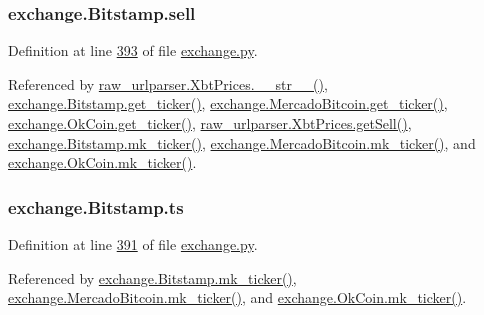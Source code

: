 \subsubsection[{\texorpdfstring{sell}{sell}}]{\setlength{\rightskip}{0pt plus 5cm}exchange.\+Bitstamp.\+sell}\hypertarget{classexchange_1_1_bitstamp_ae5bc1532848b36cd9ac5e46763f4ee14}{}\label{classexchange_1_1_bitstamp_ae5bc1532848b36cd9ac5e46763f4ee14}


Definition at line \hyperlink{exchange_8py_source_l00393}{393} of file \hyperlink{exchange_8py_source}{exchange.\+py}.



Referenced by \hyperlink{raw__urlparser_8py_source_l00074}{raw\+\_\+urlparser.\+Xbt\+Prices.\+\_\+\+\_\+str\+\_\+\+\_\+()}, \hyperlink{exchange_8py_source_l00401}{exchange.\+Bitstamp.\+get\+\_\+ticker()}, \hyperlink{exchange_8py_source_l00535}{exchange.\+Mercado\+Bitcoin.\+get\+\_\+ticker()}, \hyperlink{exchange_8py_source_l00600}{exchange.\+Ok\+Coin.\+get\+\_\+ticker()}, \hyperlink{raw__urlparser_8py_source_l00065}{raw\+\_\+urlparser.\+Xbt\+Prices.\+get\+Sell()}, \hyperlink{exchange_8py_source_l00415}{exchange.\+Bitstamp.\+mk\+\_\+ticker()}, \hyperlink{exchange_8py_source_l00549}{exchange.\+Mercado\+Bitcoin.\+mk\+\_\+ticker()}, and \hyperlink{exchange_8py_source_l00614}{exchange.\+Ok\+Coin.\+mk\+\_\+ticker()}.

\subsubsection[{\texorpdfstring{ts}{ts}}]{\setlength{\rightskip}{0pt plus 5cm}exchange.\+Bitstamp.\+ts}\hypertarget{classexchange_1_1_bitstamp_a8e85011dca7c70ffd1ed5ed398b0ed34}{}\label{classexchange_1_1_bitstamp_a8e85011dca7c70ffd1ed5ed398b0ed34}


Definition at line \hyperlink{exchange_8py_source_l00391}{391} of file \hyperlink{exchange_8py_source}{exchange.\+py}.



Referenced by \hyperlink{exchange_8py_source_l00415}{exchange.\+Bitstamp.\+mk\+\_\+ticker()}, \hyperlink{exchange_8py_source_l00549}{exchange.\+Mercado\+Bitcoin.\+mk\+\_\+ticker()}, and \hyperlink{exchange_8py_source_l00614}{exchange.\+Ok\+Coin.\+mk\+\_\+ticker()}.

